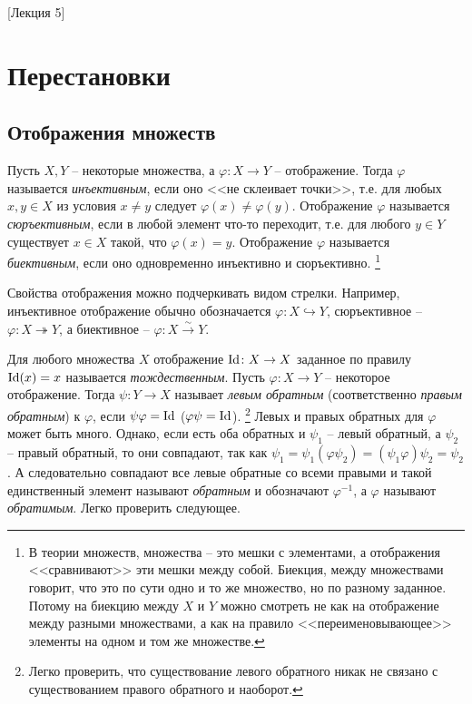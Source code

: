 [Лекция 5]


\newpage

\section{Перестановки}

\subsection{Отображения множеств}

Пусть $X,Y$ -- некоторые множества, а $\varphi\colon X\to Y$ -- отображение.
Тогда $\varphi$ называется {\it инъективным}, если оно <<не склеивает точки>>, т.е. для любых $x,y\in X$ из условия $x\neq y$ следует $\varphi(x)\neq\varphi(y)$.
Отображение $\varphi$ называется {\it сюръективным}, если в любой элемент что-то переходит, т.е. для любого $y\in Y$ существует $x\in X$ такой, что $\varphi(x)=y$.
Отображение $\varphi$ называется {\it биективным}, если оно одновременно инъективно и сюръективно.%
\footnote{В теории множеств, множества -- это мешки с элементами, а отображения <<сравнивают>> эти мешки между собой.
Биекция, между множествами говорит, что это по сути одно и то же множество, но по разному заданное.
Потому на биекцию между $X$ и $Y$ можно смотреть не как на отображение между разными множествами, а как на правило <<переименовывающее>> элементы на одном и том же множестве.}

Свойства отображения можно подчеркивать видом стрелки.
Например, инъективное отображение обычно обозначается $\varphi\colon X\hookrightarrow Y$, сюръективное -- $\varphi\colon X\twoheadrightarrow Y$, а биективное --  $\varphi\colon X\stackrel{\sim}{\longrightarrow}Y$.

Для любого множества $X$ отображение $\operatorname{Id}\colon X\to X$ заданное по правилу $\operatorname{Id}(x) = x$ называется {\it тождественным}.
Пусть $\varphi\colon X\to Y$ -- некоторое отображение.
Тогда $\psi\colon Y\to X$ называет {\it левым обратным} (соответственно {\it правым обратным}) к $\varphi$, если $\psi\varphi = \operatorname{Id}$ ($\varphi\psi = \operatorname{Id}$).%
\footnote{Легко проверить, что существование левого обратного никак не связано с существованием правого обратного и наоборот.}
Левых и правых обратных для $\varphi$ может быть много.
Однако, если есть оба обратных и $\psi_1$ -- левый обратный, а $\psi_2$ -- правый обратный, то они совпадают, так как $\psi_1 = \psi_1 (\varphi \psi_2) = (\psi_1\varphi)\psi_2 = \psi_2$.
А следовательно совпадают все левые обратные со всеми правыми и такой единственный элемент называют {\it обратным} и обозначают $\varphi^{-1}$, а $\varphi$ называют {\it обратимым}.
Легко проверить следующее.

